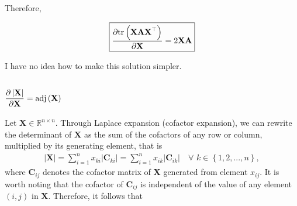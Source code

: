 \documentclass{article}
\newcommand{\adj}[1]{\ensuremath{\textnormal{adj}\left(#1\right)}} %
\newcommand\abs[1]{\left\lvert#1\right\rvert}
\begin{document}
Therefore,

\begin{align}
    \boxed{\dfrac{\partial \textnormal{tr}\left(\mathbf{XAX}^\top\right)}{\partial \mathbf{X}} = 2\mathbf{XA}}
\end{align}

I have no idea how to make this solution simpler.

\subsection{\(\dfrac{\partial \abs{\mathbf{X}}}{\partial \mathbf{X}} = \adj{\mathbf{X}}\)}
Let \(\mathbf{X} \in \mathbb{R}^{n\times n}\). Through Laplace expansion (cofactor expansion), we can rewrite the determinant of \(\mathbf{X}\) as the sum of the cofactors of any row or column, multiplied by its generating element, that is
\begin{align}
    \abs{\mathbf{X}} = \sum_{i = 1}^{n} x_{ki} \abs{\mathbf{C}_{ki}} = \sum_{i = 1}^{n} x_{ik} \abs{\mathbf{C}_{ik}} \,\,\,\,\,\, \forall \,\, k \in \left\{ 1, 2, ..., n \right\},
\end{align}
where \(\mathbf{C}_{ij}\) denotes the cofactor matrix of \(\mathbf{X}\) generated from element \(x_{ij}\). It is worth noting that the cofactor of \(\mathbf{C}_{ij}\) is independent of the value of any element \((i,j)\) in \(\mathbf{X}\). Therefore, it follows that
\end{document}
